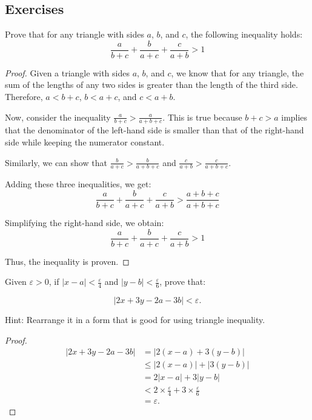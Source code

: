 \documentclass[
	12pt, %
	fleqn, %
	a4paper, %
]{LegrandOrangeBook}
\begin{document}
\subsection{Exercises}
\begin{exercise}
    Prove that for any triangle with sides \(a\), \(b\), and \(c\), the following inequality holds:
\[ \frac{a}{b + c} + \frac{b}{a + c} + \frac{c}{a + b} > 1 \]
\end{exercise}
\begin{proof}

Given a triangle with sides \(a\), \(b\), and \(c\), we know that for any triangle, the sum of the lengths of any two sides is greater than the length of the third side. Therefore, \(a < b + c\), \(b < a + c\), and \(c < a + b\).

Now, consider the inequality \(\frac{a}{b + c} > \frac{a}{a + b + c}\). This is true because \(b + c > a\) implies that the denominator of the left-hand side is smaller than that of the right-hand side while keeping the numerator constant.

Similarly, we can show that \(\frac{b}{a + c} > \frac{b}{a + b + c}\) and \(\frac{c}{a + b} > \frac{c}{a + b + c}\).

Adding these three inequalities, we get:
\[ \frac{a}{b + c} + \frac{b}{a + c} + \frac{c}{a + b} > \frac{a + b + c}{a + b + c} \]

Simplifying the right-hand side, we obtain:
\[ \frac{a}{b + c} + \frac{b}{a + c} + \frac{c}{a + b} > 1 \]

Thus, the inequality is proven. 

\end{proof}

\begin{exercise}
    Given $\varepsilon > 0$, if $|x - a| < \frac{\varepsilon}{4}$ and $|y - b| < \frac{\varepsilon}{6}$, prove that:

\[
|2x + 3y - 2a - 3b| < \varepsilon.
\]
\end{exercise}
Hint: Rearrange it in a form that is good for using triangle inequality.
\begin{proof}
    \begin{align*}
        |2x + 3y - 2a - 3b| &= |2(x - a) + 3(y - b)| \\
        &\leq |2(x - a)| + |3(y - b)| \\
        &= 2|x - a| + 3|y - b| \\
        &< 2 \times \frac{\varepsilon}{4} + 3 \times \frac{\varepsilon}{6} \\
        &= \varepsilon.
        \end{align*}
\end{proof}
\end{document}

